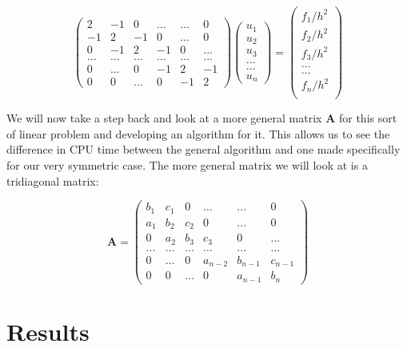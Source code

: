 \documentclass[a4paper,11pt]{article}
\begin{document}
{\begin{equation}
\begin{pmatrix}
2 & -1 & 0 & ... & ... & 0 \\
-1 & 2 & -1 & 0 & ... & 0 \\
0 & -1 & 2 & -1 & 0 & ... \\
... & ... & ... & ... & ... & ... \\
0 & ... & 0 & -1 & 2 & -1 \\
0 & 0 & ... & 0 & -1 & 2 
\end{pmatrix} \begin{pmatrix}
u_1\\
u_2\\
u_3\\
...\\
...\\
u_n
\end{pmatrix} = \begin{pmatrix}
f_1/h^2 \\
f_2/h^2 \\
f_3/h^2 \\
... \\
... \\
f_n/h^2 \\
\end{pmatrix}
\end{equation}

We will now take a step back and look at a more general matrix $\mathbf{A}$ for this sort of linear problem and developing an algorithm for it. This allows us to see the difference in CPU time between the general algorithm and one made specifically for our very symmetric case. The more general matrix we will look at is a tridiagonal matrix:

\begin{equation}
\mathbf{A} = \begin{pmatrix}
b_1 & c_1 & 0 & ... & ... & 0 \\
a_1 & b_2 & c_2 & 0 & ... & 0 \\
0 & a_2 & b_3 & c_3 & 0 & ... \\
... & ... & ... & ... & ... & ... \\
0 & ... & 0 & a_{n-2} & b_{n-1} & c_{n-1} \\
0 & 0 & ... & 0 & a_{n-1} & b_{n} 
\end{pmatrix}
\label{general_tridiagonal_matrix}
\end{equation}





\section*{Results}



}
\end{document}
